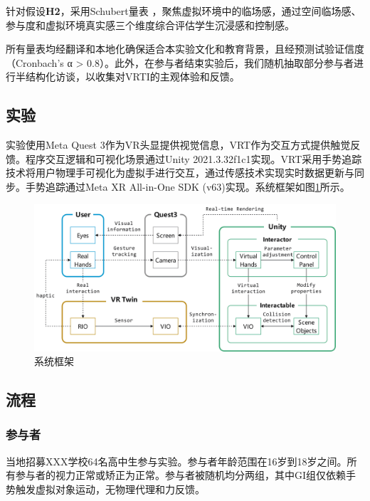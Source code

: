 \documentclass[runningheads]{llncs}
\begin{document}

针对假设\textbf{H2}，采用Schubert量表 \cite{schubert2001experience}，聚焦虚拟环境中的临场感，通过空间临场感、参与度和虚拟环境真实感三个维度综合评估学生沉浸感和控制感。

所有量表均经翻译和本地化确保适合本实验文化和教育背景，且经预测试验证信度（Cronbach's α > 0.8）。此外，在参与者结束实验后，我们随机抽取部分参与者进行半结构化访谈，以收集对VRTI的主观体验和反馈。

\subsection{实验}
实验使用Meta Quest 3作为VR头显提供视觉信息，VRT作为交互方式提供触觉反馈。程序交互逻辑和可视化场景通过Unity 2021.3.32f1c1实现。VRT采用手势追踪技术将用户物理手可视化为虚拟手进行交互，通过传感技术实现实时数据更新与同步。手势追踪通过Meta XR All-in-One SDK (v63)实现。系统框架如图\ref{fig:system-framework-flowchart}所示。

\begin{figure}[t]
  \centering
  \includegraphics[width=1\textwidth]{image/system-framework-flowchart.pdf}
  \caption{系统框架}
  \label{fig:system-framework-flowchart}
\end{figure}

\subsection{流程}
\subsubsection{参与者}
当地招募XXX学校64名高中生参与实验。参与者年龄范围在16岁到18岁之间。所有参与者的视力正常或矫正为正常。参与者被随机均分两组，其中GI组仅依赖手势触发虚拟对象运动，无物理代理和力反馈。
\end{document}
